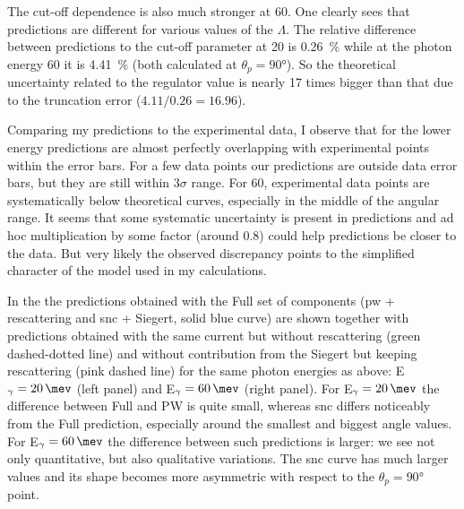     The cut-off dependence is also much stronger at \SI{60}{\mev}. One clearly sees
    that predictions are different for various values of the $\Lambda$.
    The relative difference between predictions to the cut-off parameter at \SI{20}{\mev}
    is \SI{0.26}{\percent} while at the photon energy \SI{60}{\mev}
    it is  \SI{4.41}{\percent} (both calculated at $\theta_p=\ang{90}$).
    So the theoretical uncertainty related to the regulator value
    is nearly 17 times bigger than that due to the truncation error ($4.11/0.26 = 16.96$).

     Comparing my predictions to the experimental data, I observe that
     for the lower energy predictions are almost perfectly overlapping
     with experimental points within the error bars. 
     For a few data points our predictions are
     outside data error bars, but they are still within $3\sigma$ range.
     For \SI{60}{\mev}, experimental data points are systematically below theoretical
     curves, especially in the middle of the angular range. It seems that some systematic 
     uncertainty is present in predictions and ad hoc multiplication by some factor
     (around 0.8)
     could help predictions be closer to the data. But very likely the observed discrepancy
     points to the simplified character of the model used in my calculations.

     In the  the predictions obtained with the Full set of
     components (\gls{pw} + rescattering and \gls{snc} + Siegert, solid blue curve) are shown
     together with predictions obtained with the same current but without rescattering (green dashed-dotted line)
     and without contribution from the Siegert but keeping rescattering (pink dashed line) for the same 
     photon energies as above: E$_\gamma=\SI{20}{\mev}$ (left panel)
     and E$_\gamma=\SI{60}{\mev}$ (right panel).
     For E$_\gamma=\SI{20}{\mev}$ the difference between Full and PW
     is quite small, whereas \gls{snc} differs noticeably from the Full prediction,
     especially around the smallest and biggest angle values.
     For E$_\gamma=\SI{60}{\mev}$ the difference between such predictions 
     is larger: we see not only quantitative, but also qualitative variations.
     The \gls{snc} curve has much larger values and its shape becomes 
     more asymmetric with respect to the $\theta_p = \ang{90}$ point.

